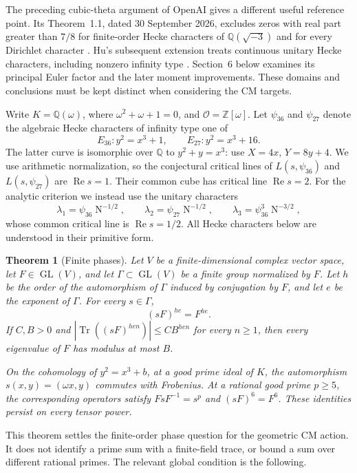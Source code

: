 \documentclass[11pt]{article}
\newcommand{\Q}{\mathbb Q}
\newcommand{\Z}{\mathbb Z}
\newcommand{\Tr}{\operatorname{Tr}}
\newcommand{\N}{\operatorname{N}}
\newcommand{\Rea}{\operatorname{Re}}
\newtheorem{theorem}{Theorem}[section]
\theoremstyle{definition}
\theoremstyle{remark}
\begin{document}
The preceding cubic-theta argument of OpenAI gives a different useful
reference point.  Its Theorem~1.1, dated 30 September 2026, excludes
zeros with real part greater than $7/8$ for finite-order Hecke
characters of $\Q(\sqrt{-3})$ and for every Dirichlet character
\cite[p.~4]{OpenAIQRH}.  Hu's subsequent extension treats continuous
unitary Hecke characters, including nonzero infinity type
\cite[Theorem~1.2]{Hu}.  Section~6 below examines its principal Euler
factor and the later moment improvements.  These domains and
conclusions must be kept distinct when considering the CM targets.

Write $K=\Q(\omega)$, where $\omega^2+\omega+1=0$, and
$\mathcal O=\Z[\omega]$.  Let $\psi_{36}$ and $\psi_{27}$ denote the
algebraic Hecke characters of infinity type one of
\[
 E_{36}:y^2=x^3+1,\qquad E_{27}:y^2=x^3+16.
\]
The latter curve is isomorphic over $\Q$ to $y^2+y=x^3$: use
$X=4x$, $Y=8y+4$.  We use arithmetic normalization, so the conjectural
critical lines of $L(s,\psi_{36})$ and $L(s,\psi_{27})$ are
$\Rea s=1$.  Their common cube has critical line $\Rea s=2$.
For the analytic criterion we instead use the unitary characters
\begin{equation}\label{eq:targets}
 \lambda_1=\psi_{36}\N^{-1/2},\qquad
 \lambda_2=\psi_{27}\N^{-1/2},\qquad
 \lambda_3=\psi_{36}^{3}\N^{-3/2},
\end{equation}
whose common critical line is $\Rea s=1/2$.
All Hecke characters below are understood in their primitive form.

\begin{theorem}[Finite phases]\label{thm:phase}
Let $V$ be a finite-dimensional complex vector space, let
$F\in\operatorname{GL}(V)$, and let $\Gamma\subset\operatorname{GL}(V)$ be
a finite group normalized by $F$.  Let $h$ be the order of the automorphism
of $\Gamma$ induced by conjugation by $F$, and let $e$ be the exponent of
$\Gamma$.  For every $s\in\Gamma$,
\[
 (sF)^{he}=F^{he}.
\]
If $C,B>0$ and $|\Tr((sF)^{hen})|\leq C B^{hen}$ for every $n\geq1$, then every
eigenvalue of $F$ has modulus at most $B$.

On the cohomology of $y^2=x^3+b$, at a good prime ideal of $K$, the
automorphism $s(x,y)=(\omega x,y)$ commutes with Frobenius.
At a rational good prime $p\geq5$, the corresponding operators satisfy
$FsF^{-1}=s^p$ and $(sF)^6=F^6$.
These identities persist on every tensor power.
\end{theorem}

This theorem settles the finite-order phase question for the geometric CM
action.  It does not identify a prime sum with a finite-field trace, or
bound a sum over different rational primes.  The relevant global condition
is the following.
\end{document}
